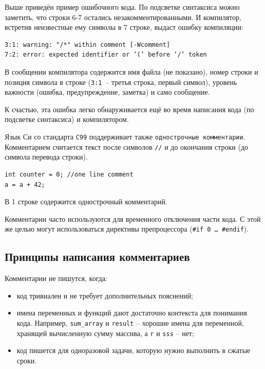 \documentclass[myc.tex]{subfiles}
\begin{document}
Выше приведён пример ошибочного кода. По подсветке синтаксиса можно заметить, что строки 6-7 остались незакомментированными. И компилятор, встретив неизвестные ему символы в 7 строке, выдаст ошибку компиляции:

\begin{small}
\begin{verbatim}
3:1: warning: "/*" within comment [-Wcomment]
7:2: error: expected identifier or ‘(’ before ‘/’ token
\end{verbatim} 
\end{small}

В сообщении компилятора содержится имя файла (не показано), номер строки и позиция символа в строке (\texttt{3:1}~-- третья строка, первый символ), уровень важности (ошибка, предупреждение, заметка) и само сообщение.

К счастью, эта ошибка легко обнаруживается ещё во время написания кода (по подсветке синтаксиса) и компилятором.

Язык Си со стандарта \texttt{C99} поддерживает также \texttt{однострочные комментарии}. Комментарием считается текст после символов \texttt{//} и до окончания строки (до символа перевода строки).

\begin{lstlisting}[title=Пример однострочного комментария]
int counter = 0; //one line comment
a = a + 42;
\end{lstlisting}

В 1 строке содержится однострочный комментарий.

Комментарии часто используются для временного отключения части кода. С этой же целью могут использоваться директивы препроцессора (\texttt{\#if 0 … \#endif}).



\subsection{Принципы написания комментариев}
Комментарии не пишутся, когда:
\begin{itemize}
\item код тривиален и не требует дополнительных пояснений;
\item имена переменных и функций дают достаточно контекста для понимания кода. Например, \texttt{sum\_array} и \texttt{result} -- хорошие имена для переменной, хранящей вычисленную сумму массива, а \texttt{r} и \texttt{sss} -- нет;
\item код пишется для одноразовой задачи, которую нужно выполнить в сжатые сроки.
\end{itemize}
\end{document}
